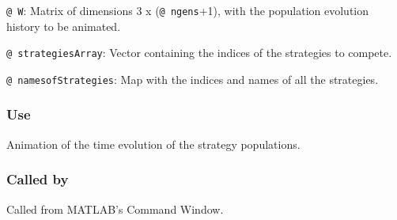 \documentclass[12pt]{report}
\begin{document}
\texttt{@ W}: Matrix of dimensions 3 x (\texttt{@ ngens}+1), with the population evolution history to be animated.

\texttt{@ strategiesArray}: Vector containing the indices of the strategies to compete.

\texttt{@ namesofStrategies}: Map with the indices and names of all the strategies.

\subsubsection*{Use}
Animation of the time evolution of the strategy populations.

\subsubsection*{Called by}
Called from MATLAB's Command Window.
\end{document}
